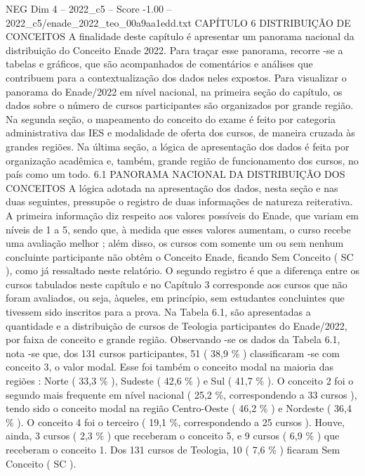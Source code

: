 \begin{textsample}{NEG Dim 4 – 2022\_c5 – Score -1.00 – 2022\_c5/enade\_2022\_teo\_00a9aa1edd.txt}  \label{ex:f4_neg_071}
CAPÍTULO 6 DISTRIBUIÇÃO DE CONCEITOS A finalidade deste capítulo é apresentar um panorama nacional da distribuição do Conceito Enade 2022.
Para traçar esse panorama, recorre -se a tabelas e gráficos, que são acompanhados de comentários e análises que contribuem para a contextualização dos dados neles expostos.
Para visualizar o panorama do Enade/2022 em nível nacional, na primeira seção do capítulo, os dados sobre o número de cursos participantes são organizados por grande região.
Na segunda seção, o mapeamento do conceito do exame é feito por categoria administrativa das IES e modalidade de oferta dos cursos, de maneira cruzada às grandes regiões.
Na última seção, a lógica de apresentação dos dados é feita por organização acadêmica e, também, grande região de funcionamento dos cursos, no país como um todo. 6.1 PANORAMA NACIONAL DA DISTRIBUIÇÃO DOS CONCEITOS A lógica adotada na apresentação dos dados, nesta seção e nas duas seguintes, pressupõe o registro de duas informações de natureza reiterativa.
A primeira informação diz respeito aos valores possíveis do Enade, que variam em níveis de 1 a 5, sendo que, à medida que esses valores aumentam, o curso recebe uma avaliação melhor ; além disso, os cursos com somente um ou sem nenhum concluinte participante não obtêm o Conceito Enade, ficando Sem Conceito ( SC ), como já ressaltado neste relatório.
O segundo registro é que a diferença entre os cursos tabulados neste capítulo e no Capítulo 3 corresponde aos cursos que não foram avaliados, ou seja, àqueles, em princípio, sem estudantes concluintes que tivessem sido inscritos para a prova.
Na Tabela 6.1, são apresentadas a quantidade e a distribuição de cursos de Teologia participantes do Enade/2022, por faixa de conceito e grande região.
Observando -se os dados da Tabela 6.1, nota -se que, dos 131 cursos participantes, 51 ( 38,9 \% ) classificaram -se com conceito 3, o valor modal.
Esse foi também o conceito modal na maioria das regiões : Norte ( 33,3 \% ), Sudeste ( 42,6 \% ) e Sul ( 41,7 \% ).
O conceito 2 foi o segundo mais frequente em nível nacional ( 25,2 \%, correspondendo a 33 cursos ), tendo sido o conceito modal na região Centro-Oeste ( 46,2 \% ) e Nordeste ( 36,4 \% ).
O conceito 4 foi o terceiro ( 19,1 \%, correspondendo a 25 cursos ).
Houve, ainda, 3 cursos ( 2,3 \% ) que receberam o conceito 5, e 9 cursos ( 6,9 \% ) que receberam o conceito 1.
Dos 131 cursos de Teologia, 10 ( 7,6 \% ) ficaram Sem Conceito ( SC ).

\end{textsample}

